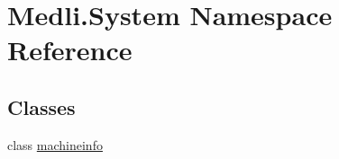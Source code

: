 \hypertarget{namespace_medli_1_1_system}{}\section{Medli.\+System Namespace Reference}
\label{namespace_medli_1_1_system}
\subsection*{Classes}
\begin{DoxyCompactItemize}
\item 
class \hyperlink{class_medli_1_1_system_1_1machineinfo}{machineinfo}
\end{DoxyCompactItemize}
